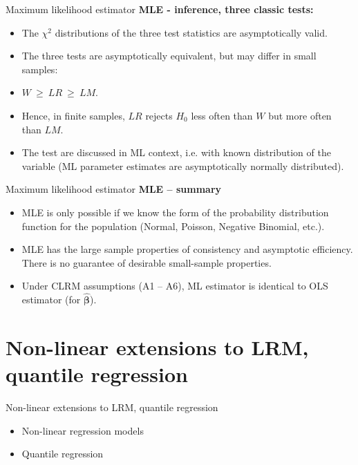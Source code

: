 \documentclass{beamer}
\begin{document}
\begin{frame}{Maximum likelihood estimator}
\textbf{MLE - inference, three classic tests:}\\ \bigskip
\begin{itemize}
    \item The $\chi^2$ distributions of the three test statistics are asymptotically valid.
    \medskip
    \item The three tests are asymptotically equivalent, but may differ in small samples:
    \medskip
    \item $W ~\geq~ \textit{LR}~\geq~ \textit{LM}$.
    \medskip
    \item Hence, in finite samples, $\textit{LR}$ rejects $H_0$ less often than $W$ but more often than $\textit{LM}$.
    \medskip
    \item The test are discussed in ML context, i.e. with known distribution of the variable (ML parameter estimates are asymptotically normally distributed).
    
\end{itemize}
\end{frame}
\begin{frame}{Maximum likelihood estimator}
\textbf{MLE -- summary}\\ \medskip
\begin{itemize}
\item MLE is only possible if we know the form of the probability distribution function for the population (Normal, Poisson, Negative Binomial, etc.).
\medskip
\item MLE has the large sample properties of consistency and asymptotic efficiency. There is no guarantee of desirable small-sample properties. 
\medskip
\item Under CLRM assumptions (A1 -- A6), ML estimator is identical to OLS estimator (for $\hat{\bm{\beta}}$).
\end{itemize}
\end{frame}
\section{Non-linear extensions to LRM, quantile regression}
\begin{frame}{Non-linear extensions to LRM, quantile regression}
    \bigskip
    \begin{itemize}
        \item Non-linear regression models
        \bigskip
        \item Quantile regression
        
    \end{itemize}
\end{frame}
\end{document}
